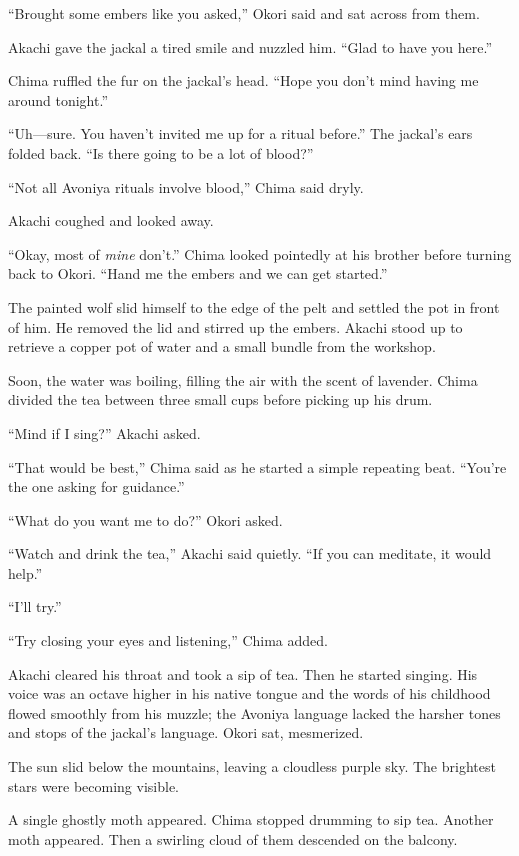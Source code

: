 ``Brought some embers like you asked,'' Okori said and sat across from them.

Akachi gave the jackal a tired smile and nuzzled him. ``Glad to have you here.''

Chima ruffled the fur on the jackal's head. ``Hope you don't mind having me around tonight.''

``Uh---sure. You haven't invited me up for a ritual before.'' The jackal's ears folded back. ``Is there going to be a lot of blood?''

``Not all Avoniya rituals involve blood,'' Chima said dryly.

Akachi coughed and looked away.

``Okay, most of \emph{mine} don't.'' Chima looked pointedly at his brother before turning back to Okori. ``Hand me the embers and we can get started.''

The painted wolf slid himself to the edge of the pelt and settled the pot in front of him. He removed the lid and stirred up the embers. Akachi stood up to retrieve a copper pot of water and a small bundle from the workshop.

Soon, the water was boiling, filling the air with the scent of lavender. Chima divided the tea between three small cups before picking up his drum.

``Mind if I sing?'' Akachi asked.

``That would be best,'' Chima said as he started a simple repeating beat. ``You're the one asking for guidance.''

``What do you want me to do?'' Okori asked.

``Watch and drink the tea,'' Akachi said quietly. ``If you can meditate, it would help.''

``I'll try.''

``Try closing your eyes and listening,'' Chima added.

Akachi cleared his throat and took a sip of tea. Then he started singing. His voice was an octave higher in his native tongue and the words of his childhood flowed smoothly from his muzzle; the Avoniya language lacked the harsher tones and stops of the jackal's language. Okori sat, mesmerized.

The sun slid below the mountains, leaving a cloudless purple sky. The brightest stars were becoming visible.

A single ghostly moth appeared. Chima stopped drumming to sip tea. Another moth appeared. Then a swirling cloud of them descended on the balcony.

